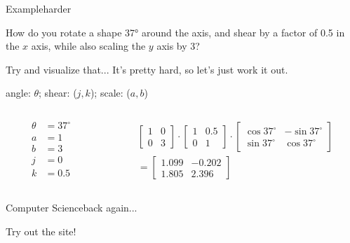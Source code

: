 \documentclass{beamer}
\begin{document}
\begin{frame}{Example}{harder}

  {\Large How do you rotate a shape 37° around the axis, and shear by a factor of
          0.5 in the $x$ axis, while also scaling the $y$ axis by 3?} \pause
      
  Try and visualize that... \pause It's pretty hard, so let's just work it out. \pause

  \vspace{0.3cm}

  angle: $\theta$; shear: ($j, k$); scale: ($a, b$)

  \vspace{0.5cm}

  \begin{columns}
    \begin{column}{0.3\textwidth}
      \begin{align*}
        \theta &= 37^{\circ} \\
        a &= 1 \\
        b &= 3 \\
        j &= 0 \\
        k &= 0.5
      \end{align*} \pause
    \end{column}
    \begin{column}{0.7\textwidth}
      \begin{align*}
        \begin{bmatrix}
          1 & 0 \\
          0 & 3
        \end{bmatrix}
        \cdot
        \begin{bmatrix}
          1 & 0.5 \\
          0 & 1
        \end{bmatrix}
        \cdot
        \begin{bmatrix}
          \cos{37^{\circ}} & -\sin{37^{\circ}} \\
          \sin{37^{\circ}} & \cos{37^{\circ}}
        \end{bmatrix} \\
        =
        \begin{bmatrix}
          1.099 & -0.202 \\
          1.805 & 2.396
        \end{bmatrix}
      \end{align*}
    \end{column}
  \end{columns}
\end{frame}

\begin{frame}{Computer Science}{back again...}

  \begin{center}
    \huge Try out the site!

    \vspace{1cm}


  \end{center}

\end{frame}
\end{document}
